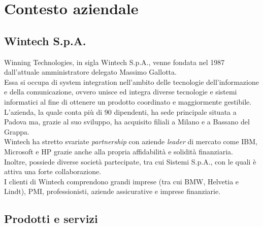 \chapter{Contesto aziendale}
\label{cap:contestoAziendale}

\section{Wintech S.p.A.}
Winning Technologies, in sigla Wintech S.p.A., venne fondata nel 1987 dall'attuale amministratore delegato Massimo Gallotta.\\
Essa si occupa di \gls{system integration} nell'ambito delle tecnologie dell'informazione e della comunicazione, ovvero unisce ed integra diverse tecnologie e sistemi informatici al fine di ottenere un prodotto coordinato e maggiormente gestibile.\\
L'azienda, la quale conta più di 90 dipendenti, ha sede principale situata a Padova ma, grazie al suo sviluppo, ha acquisito filiali a Milano e a Bassano del Grappa.\\
Wintech ha stretto svariate \emph{partnership} con aziende \emph{leader} di mercato come IBM, Microsoft e HP grazie anche alla propria affidabilità e solidità finanziaria.\\ 
Inoltre, possiede diverse società partecipate, tra cui Sistemi S.p.A., con le quali è attiva una forte collaborazione.\\
I clienti di Wintech comprendono grandi imprese (tra cui BMW, Helvetia e Lindt), PMI, professionisti, aziende assicurative e imprese finanziarie. 

\section{Prodotti e servizi}
